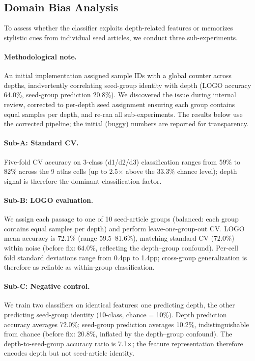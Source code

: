\subsection{Domain Bias Analysis}
\label{app:domain_bias}

To assess whether the classifier exploits depth-related features or memorizes stylistic cues from individual seed articles, we conduct three sub-experiments.

\paragraph{Methodological note.}
An initial implementation assigned sample IDs with a global counter across depths, inadvertently correlating seed-group identity with depth (LOGO accuracy 64.0\%, seed-group prediction 20.8\%).
We discovered the issue during internal review, corrected to per-depth seed assignment ensuring each group contains equal samples per depth, and re-ran all sub-experiments.
The results below use the corrected pipeline; the initial (buggy) numbers are reported for transparency.

\paragraph{Sub-A: Standard CV.}
Five-fold CV accuracy on 3-class (d1/d2/d3) classification ranges from 59\% to 82\% across the 9 atlas cells (up to 2.5$\times$ above the 33.3\% chance level); depth signal is therefore the dominant classification factor.

\paragraph{Sub-B: LOGO evaluation.}
We assign each passage to one of 10 seed-article groups (balanced: each group contains equal samples per depth) and perform leave-one-group-out CV.
LOGO mean accuracy is 72.1\% (range 59.5--81.6\%), matching standard CV (72.0\%) within noise (before fix: 64.0\%, reflecting the depth--group confound).
Per-cell fold standard deviations range from 0.4pp to 1.4pp; cross-group generalization is therefore as reliable as within-group classification.

\paragraph{Sub-C: Negative control.}
We train two classifiers on identical features: one predicting depth, the other predicting seed-group identity (10-class, chance = 10\%).
Depth prediction accuracy averages 72.0\%; seed-group prediction averages 10.2\%, indistinguishable from chance (before fix: 20.8\%, inflated by the depth--group confound).
The depth-to-seed-group accuracy ratio is 7.1$\times$; the feature representation therefore encodes depth but not seed-article identity.

